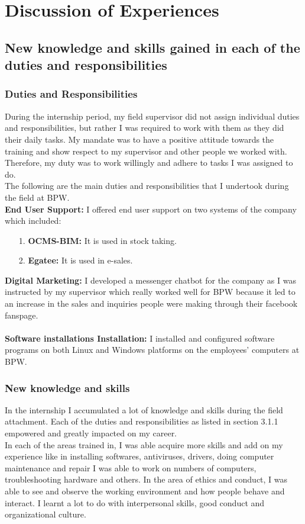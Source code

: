 \chapter{Discussion of Experiences}

\section{New knowledge and skills gained in each of the duties and responsibilities}
\subsection{Duties and Responsibilities}
During the internship period, my field supervisor did not assign individual duties and responsibilities, but rather I was required to work with them as they did their daily tasks. My mandate was to have a positive attitude towards the training and show respect to my supervisor and other people we worked with. Therefore, my duty was to work willingly and adhere to tasks I was assigned to do. \\
The following are the main duties and responsibilities that I undertook during the field at BPW.\\
\textbf{End User Support:} I offered end user support on two systems of the company which included:
\begin{itemize}
\item[1.] \textbf{OCMS-BIM:} It is used in stock taking.
\item[2.] \textbf{Egatee:} It is used in e-sales.
\end{itemize}
\textbf{Digital Marketing:} I developed a messenger chatbot for the company as I was instructed by my supervisor which really worked well for BPW because it led to an increase in the sales and inquiries people were making through their facebook fanspage.\\ \\
\textbf{Software installations Installation:} I installed and configured software programs on both Linux and Windows platforms on the employees' computers at BPW.\\
\subsection{New knowledge and skills}
In the internship I accumulated a lot of knowledge and skills during the field attachment. Each of the duties and responsibilities as listed in section 3.1.1 empowered and greatly impacted on my career.\\
In each of the areas trained in, I was able acquire more skills and add on my experience like in installing softwares, anti­viruses, drivers, doing computer maintenance and repair I was able to work on numbers of computers, troubleshooting hardware and others.  
In the area of ethics and conduct, I was able to see and observe the working environment and how people behave and interact. I learnt a lot to do with interpersonal skills, good conduct and organizational culture. 

